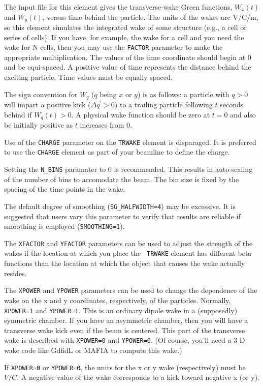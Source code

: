 The input file for this element gives the transverse-wake Green
functions, $W_x(t)$ and $W_y(t)$, versus time behind the particle. The
units of the wakes are V/C/m, so this element simulates the integrated
wake of some structure (e.g., a cell or series of cells).  If you
have, for example, the wake for a cell and you need the wake for N
cells, then you may use the {\tt FACTOR} parameter to make the
appropriate multiplication.  The values of the time coordinate should
begin at 0 and be equi-spaced.  A positive value of time represents
the distance behind the exciting particle.   Time values must be equally
spaced.

The sign convention for $W_q$ ($q$ being $x$ or $y$) is as follows: a
particle with $q>0$ will impart a positive kick ($\Delta q^\prime >
0$) to a trailing particle following $t$ seconds behind if $W_q(t)>0$.
A physical wake function should be zero at $t=0$ and also be initially
positive as $t$ increases from 0.

Use of the {\tt CHARGE} parameter on the {\tt TRWAKE} element is
disparaged.  It is preferred to use the {\tt CHARGE} element as part
of your beamline to define the charge.  

Setting the {\tt N\_BINS} paramater to 0 is recommended.  This results
in auto-scaling of the number of bins to accomodate the beam.  The bin
size is fixed by the spacing of the time points in the wake.

The default degree of smoothing ({\tt SG\_HALFWIDTH=4}) may be excessive.
It is suggested that users vary this parameter to verify that results
are reliable if smoothing is employed ({\tt SMOOTHING=1}).

The {\tt XFACTOR} and {\tt YFACTOR} parameters can be used to adjust
the strength of the wakes if the location at which you place the {\tt
TRWAKE} element has different beta functions than the location at
which the object that causes the wake actually resides.  

The {\tt XPOWER} and {\tt YPOWER} parameters can be used to change the
dependence of the wake on the x and y coordinates, respectively, of
the particles.  Normally, {\tt XPOWER=1} and {\tt YPOWER=1}.  This is
an ordinary dipole wake in a (supposedly) symmetric chamber.  If you
have an asymmetric chamber, then you will have a transverse wake kick
even if the beam is centered.  This part of the transverse wake is
described with {\tt XPOWER=0} and {\tt YPOWER=0}.  (Of course, you'll
need a 3-D wake code like GdfidL or MAFIA to compute this wake.)

If {\tt XPOWER=0} or {\tt YPOWER=0}, the units for the x or y wake
(respectively) must be $V/C$.  A negative value of the wake
corresponds to a kick toward negative x (or y).  
